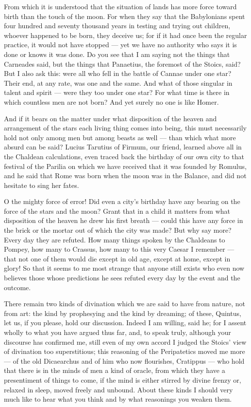  From which it is understood that the situation of lands has more force toward birth than the touch of the moon. For when they say that the Babylonians spent four hundred and seventy thousand years in testing and trying out children, whoever happened to be born, they deceive us; for if it had once been the regular practice, it would not have stopped — yet we have no authority who says it is done or knows it was done. Do you see that I am saying not the things that Carneades said, but the things that Panaetius, the foremost of the Stoics, said? But I also ask this: were all who fell in the battle of Cannae under one star? Their end, at any rate, was one and the same. And what of those singular in talent and spirit — were they too under one star? For what time is there in which countless men are not born? And yet surely no one is like Homer.

 And if it bears on the matter under what disposition of the heaven and arrangement of the stars each living thing comes into being, this must necessarily hold not only among men but among beasts as well — than which what more absurd can be said? Lucius Tarutius of Firmum, our friend, learned above all in the Chaldean calculations, even traced back the birthday of our own city to that festival of the Parilia on which we have received that it was founded by Romulus, and he said that Rome was born when the moon was in the Balance, and did not hesitate to sing her fates.

 O the mighty force of error! Did even a city's birthday have any bearing on the force of the stars and the moon? Grant that in a child it matters from what disposition of the heaven he drew his first breath — could this have any force in the brick or the mortar out of which the city was made? But why say more? Every day they are refuted. How many things spoken by the Chaldeans to Pompey, how many to Crassus, how many to this very Caesar I remember — that not one of them would die except in old age, except at home, except in glory! So that it seems to me most strange that anyone still exists who even now believes those whose predictions he sees refuted every day by the event and the outcome.

 There remain two kinds of divination which we are said to have from nature, not from art: the kind by prophesying and the kind by dreaming; of these, Quintus, let us, if you please, hold our discussion. Indeed I am willing, said he; for I assent wholly to what you have argued thus far, and, to speak truly, although your discourse has confirmed me, still even of my own accord I judged the Stoics' view of divination too superstitious; this reasoning of the Peripatetics moved me more — of the old Dicaearchus and of him who now flourishes, Cratippus — who hold that there is in the minds of men a kind of oracle, from which they have a presentiment of things to come, if the mind is either stirred by divine frenzy or, relaxed in sleep, moved freely and unbound. About these kinds I should very much like to hear what you think and by what reasonings you weaken them.


